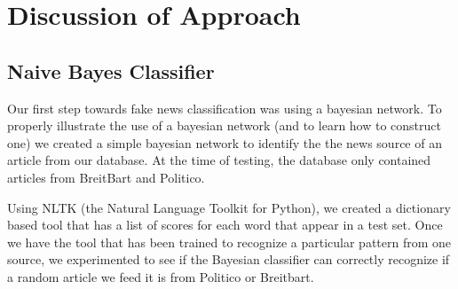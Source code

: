 \documentclass{eptcs}
\begin{document}
\section*{Discussion of Approach}
\subsection*{Naive Bayes Classifier}
Our first step towards fake news classification was using a bayesian network. To properly illustrate the use of a bayesian network (and to learn how to construct one) we created a simple bayesian network to identify the the news source of an article from our database. At the time of testing, the database only contained articles from BreitBart and Politico.

Using NLTK (the Natural Language Toolkit for Python), we created a dictionary based tool that has a list of scores for each word that appear in a test set. Once we have the tool that has been trained to recognize a particular pattern from one source, we experimented to see if the Bayesian classifier can correctly recognize if a random article we feed it is from Politico or Breitbart. 
\end{document}

